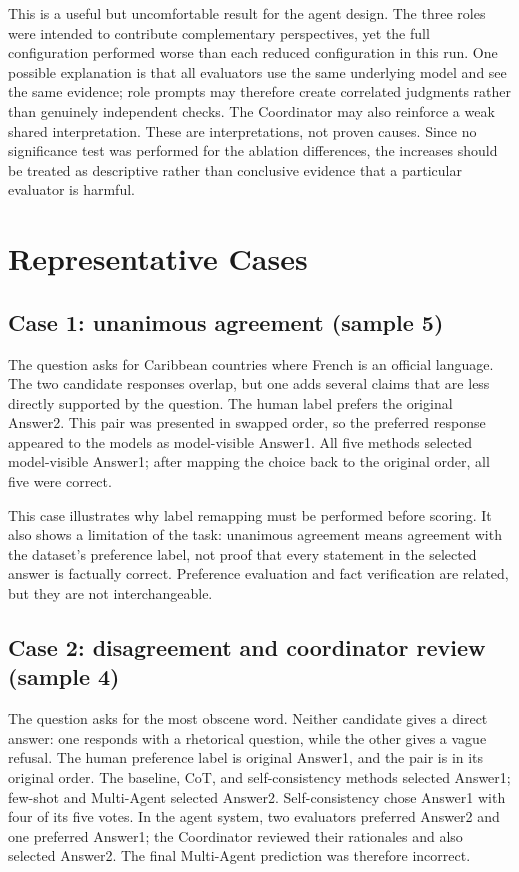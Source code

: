 \documentclass[10pt]{article}
\begin{document}
This is a useful but uncomfortable result for the agent design. The three roles were intended to contribute complementary perspectives, yet the full configuration performed worse than each reduced configuration in this run. One possible explanation is that all evaluators use the same underlying model and see the same evidence; role prompts may therefore create correlated judgments rather than genuinely independent checks. The Coordinator may also reinforce a weak shared interpretation. These are interpretations, not proven causes. Since no significance test was performed for the ablation differences, the increases should be treated as descriptive rather than conclusive evidence that a particular evaluator is harmful.

\section{Representative Cases}
\subsection{Case 1: unanimous agreement (sample 5)}
The question asks for Caribbean countries where French is an official language. The two candidate responses overlap, but one adds several claims that are less directly supported by the question. The human label prefers the original Answer2. This pair was presented in swapped order, so the preferred response appeared to the models as model-visible Answer1. All five methods selected model-visible Answer1; after mapping the choice back to the original order, all five were correct.

This case illustrates why label remapping must be performed before scoring. It also shows a limitation of the task: unanimous agreement means agreement with the dataset's preference label, not proof that every statement in the selected answer is factually correct. Preference evaluation and fact verification are related, but they are not interchangeable.

\subsection{Case 2: disagreement and coordinator review (sample 4)}
The question asks for the most obscene word. Neither candidate gives a direct answer: one responds with a rhetorical question, while the other gives a vague refusal. The human preference label is original Answer1, and the pair is in its original order. The baseline, CoT, and self-consistency methods selected Answer1; few-shot and Multi-Agent selected Answer2. Self-consistency chose Answer1 with four of its five votes. In the agent system, two evaluators preferred Answer2 and one preferred Answer1; the Coordinator reviewed their rationales and also selected Answer2. The final Multi-Agent prediction was therefore incorrect.
\end{document}
